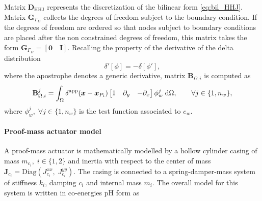 Matrix $\mathbf{D}_{\mathrm{HHJ}}$ represents the discretization of the bilinear form \eqref{eq:bil_HHJ}. Matrix $\mathbf{G}_{\Gamma_D}$ collects the degrees of freedom subject to the boundary condition. If the degrees of freedom are ordered so that nodes subject to boundary conditions are placed after the non constrained degrees of freedom, this matrix takes the form $\mathbf{G}_{\Gamma_D}= [\mathbf{0} \quad \mathbf{I}]$. Recalling the property of the derivative of the delta distribution 
$$ \delta'[\phi]  = -\delta[\phi'],$$
where the apostrophe denotes a generic derivative, matrix $\mathbf{B}_{\Omega, i}$ is computed as
\begin{equation}
\mathbf{B}_{\Omega, i}^j = \int_\Omega  \delta^{\text{app}}(\bm{x} - \bm{x}_{P_i}) \begin{bmatrix}
1 & \partial_y & -\partial_x\\
\end{bmatrix} \phi_w^j \d{\Omega}, \qquad \forall j \in \{1,n_w\},
\end{equation}
where $\phi_w^j, \; \forall j \in \{1,n_w\}$ is the test function associated to $e_w$. 

\paragraph{Proof-mass actuator model}
A proof-mass actuator is mathematically modelled by a hollow cylinder casing of mass $m_{c_i}, \; i \in \{1,2\}$ and inertia with respect to the center of mass $\mathbf{J}_{c_i}=\mathrm{Diag}(J_{c_i}^{xx}, \; J_{c_i}^{yy})$. The casing is connected to a spring-damper-mass system of stiffness $k_i$, damping $c_i$ and internal mass $m_i$. The overall model for this system is written in co-energies pH form as 

